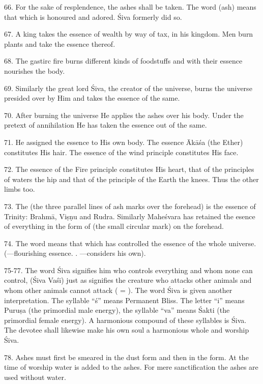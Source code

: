 66. For the sake of resplendence, the ashes shall be taken. The word 
(ash) means that which is honoured and adored. Śiva formerly did so.

67. A king takes the essence of wealth by way of tax, in his kingdom. Men burn
plants and take the essence thereof.

68. The gastirc fire burns different kinds of foodstuffs and with their essence
nourishes the body.

69. Similarly the great lord Śiva, the creator of the universe, burns
the universe presided over by Him and takes the essence of the same.

70. After burning the universe He applies the ashes over his body. Under
the pretext of annihilation He has taken the essence out of the same.

71. He assigned the essence to His own body. The essence Ākāśa (the Ether)
constitutes His hair. The essence of the wind principle constitutes His face.

72. The essence of the Fire principle constitutes His heart, that of
the principles of waters the hip and that of the principle of the Earth
the knees. Thus the other limbs too.

73. The  (the three parallel lines of ash marks over
the forehead) is the essence of Trinity: Brahmā, Viṣṇu and Rudra. Similarly
Maheśvara has retained the esence of everything in the form of 
(the small circular mark) on the forehead.

74. The word  means that which has controlled the essence of the
whole universe. (—flourishing essence. .
—considers his own).

75-77. The word Śiva signifies him who controls everything and whom none can
control, (Śiva Vaśī) just as  signifies the creature who attacks other
animals and whom other animals cannot attack ( = ). The word
Śiva is given another interpretation. The syllable “ś” means Permanent Bliss.
The letter “i” means Puruṣa (the primordial male energy), the syllable “va”
means Śakti (the primordial female energy). A harmonious compound of these
syllables is Śiva. The devotee shall likewise make his own soul a harmonious
whole and worship Śiva.

78. Ashes must first be smeared in the dust form and then in the 
form. At the time of worship water is added to the ashes. For mere
sanctification the ashes are used without water.

